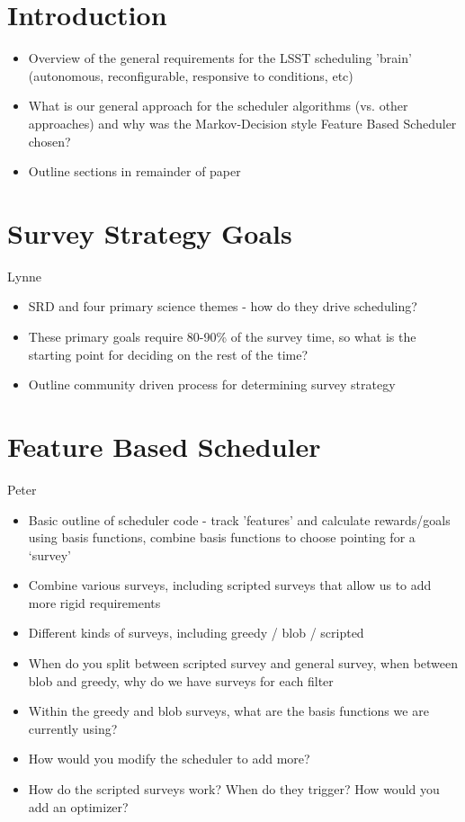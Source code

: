 \section{Introduction}

\begin{itemize}
\item Overview of the general requirements for the LSST scheduling 'brain'  (autonomous, reconfigurable, responsive to conditions, etc)
\item What is our general approach for the scheduler algorithms (vs. other approaches) and why was the Markov-Decision style Feature Based Scheduler chosen?
\item Outline sections in remainder of paper
\end{itemize} 

\section{Survey Strategy Goals}
Lynne

\begin{itemize}
\item SRD and four primary science themes - how do they drive scheduling?
\item These primary goals require 80-90\% of the survey time, so what is the starting point for deciding on the rest of the time?
\item Outline community driven process for determining survey strategy
\end{itemize}

\section{Feature Based Scheduler}
Peter

\begin{itemize}
\item Basic outline of scheduler code - track 'features' and calculate rewards/goals using basis functions, combine basis functions to choose pointing for a `survey'
\item Combine various surveys, including scripted surveys that allow us to add more rigid requirements
\item Different kinds of surveys, including greedy / blob / scripted
\item When do you split between scripted survey and general survey, when between blob and greedy, why do we have surveys for each filter
\item Within the greedy and blob surveys, what are the basis functions we are currently using? 
\item How would you modify the scheduler to add more?
\item How do the scripted surveys work? When do they trigger? How would you add an optimizer?  
\end{itemize}

